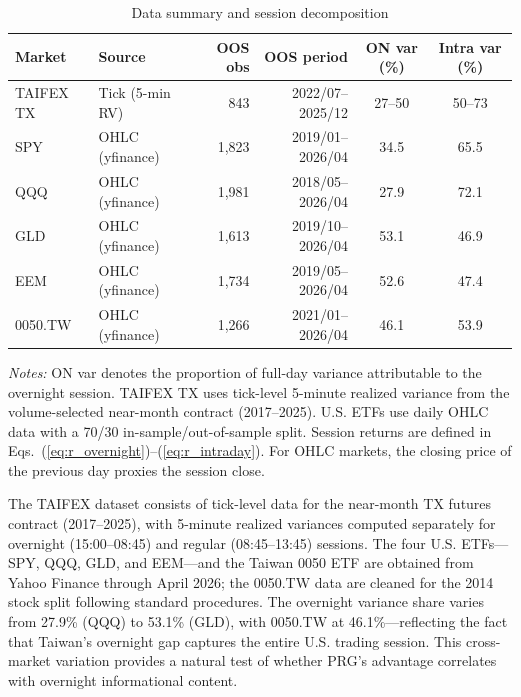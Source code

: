 \documentclass[11pt,a4paper]{article}
\begin{document}
\begin{table}[htbp]
\centering
\caption{Data summary and session decomposition}
\label{tab:data}
\small
\begin{tabular}{llrrcc}
\toprule
Market & Source & OOS obs & OOS period & ON var (\%) & Intra var (\%) \\
\midrule
TAIFEX TX  & Tick (5-min RV) & 843  & 2022/07--2025/12 & 27--50 & 50--73 \\
SPY        & OHLC (yfinance) & 1{,}823 & 2019/01--2026/04 & 34.5 & 65.5 \\
QQQ        & OHLC (yfinance) & 1{,}981 & 2018/05--2026/04 & 27.9 & 72.1 \\
GLD        & OHLC (yfinance) & 1{,}613 & 2019/10--2026/04 & 53.1 & 46.9 \\
EEM        & OHLC (yfinance) & 1{,}734 & 2019/05--2026/04 & 52.6 & 47.4 \\
0050.TW    & OHLC (yfinance) & 1{,}266 & 2021/01--2026/04 & 46.1 & 53.9 \\
\bottomrule
\end{tabular}
\begin{flushleft}
\footnotesize
\emph{Notes:} ON var denotes the proportion of full-day variance attributable to the overnight session. TAIFEX TX uses tick-level 5-minute realized variance from the volume-selected near-month contract (2017--2025). U.S. ETFs use daily OHLC data with a 70/30 in-sample/out-of-sample split. Session returns are defined in Eqs.~(\ref{eq:r_overnight})--(\ref{eq:r_intraday}). For OHLC markets, the closing price of the previous day proxies the session close.
\end{flushleft}
\end{table}

The TAIFEX dataset consists of tick-level data for the near-month TX futures contract (2017--2025), with 5-minute realized variances computed separately for overnight (15:00--08:45) and regular (08:45--13:45) sessions. The four U.S. ETFs---SPY, QQQ, GLD, and EEM---and the Taiwan 0050 ETF are obtained from Yahoo Finance through April 2026; the 0050.TW data are cleaned for the 2014 stock split following standard procedures. The overnight variance share varies from 27.9\% (QQQ) to 53.1\% (GLD), with 0050.TW at 46.1\%---reflecting the fact that Taiwan's overnight gap captures the entire U.S. trading session. This cross-market variation provides a natural test of whether PRG's advantage correlates with overnight informational content.


\end{document}
